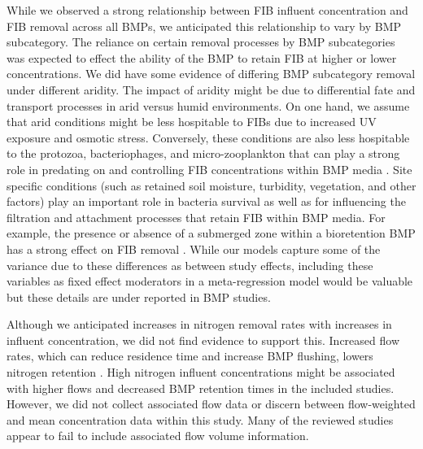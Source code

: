 \documentclass[utf8]{FrontiersinHarvard}
\begin{document}
While we observed a strong relationship between FIB influent concentration and FIB removal across all BMPs, we anticipated this relationship to vary by BMP subcategory.
The reliance on certain removal processes by BMP subcategories was expected to effect the ability of the BMP to retain FIB at higher or lower concentrations.
We did have some evidence of differing BMP subcategory removal under different aridity.
The impact of aridity might be due to differential fate and transport processes in arid versus humid environments.
On one hand, we assume that arid conditions might be less hospitable to FIBs due to increased UV exposure and osmotic stress.
Conversely, these conditions are also less hospitable to the protozoa, bacteriophages, and micro-zooplankton that can play a strong role in predating on and controlling FIB concentrations within BMP media \citep{zhangCaptureDestructionEscherichia2010, burtchettMicrozooplanktonGrazingMeans2017, deanMetaanalysisAddressingImplications2022}.
Site specific conditions (such as retained soil moisture, turbidity, vegetation, and other factors) play an important role in bacteria survival as well as for influencing the filtration and attachment processes that retain FIB within BMP media.
For example, the presence or absence of a submerged zone within a bioretention BMP has a strong effect on FIB removal \citep{rippyMeetingCriteriaLinking2015, pengIndicatorPathogenRemoval2016}.
While our models capture some of the variance due to these differences as between study effects, including these variables as fixed effect moderators in a meta-regression model would be valuable but these details are under reported in BMP studies.

Although we anticipated increases in nitrogen removal rates with increases in influent concentration, we did not find evidence to support this.
Increased flow rates, which can reduce residence time and increase BMP flushing, lowers nitrogen retention \citep{wollheimRetentionUrbanizingHeadwater2005, craigStreamRestorationStrategies2008}.
High nitrogen influent concentrations might be associated with higher flows and decreased BMP retention times in the included studies.
However, we did not collect associated flow data or discern between flow-weighted and mean concentration data within this study.
Many of the reviewed studies appear to fail to include associated flow volume information.
\end{document}
